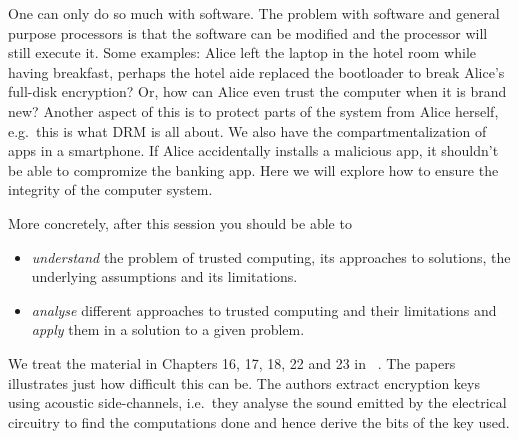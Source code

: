 One can only do so much with software.
The problem with software and general purpose processors is that the software 
can be modified and the processor will still execute it.
Some examples: Alice left the laptop in the hotel room while having breakfast, 
perhaps the hotel aide replaced the bootloader to break Alice's full-disk 
encryption?
Or, how can Alice even trust the computer when it is brand new?
Another aspect of this is to protect parts of the system from Alice herself, 
e.g.\ this is what \ac{DRM} is all about.
We also have the compartmentalization of apps in a smartphone.
If Alice accidentally installs a malicious app, it shouldn't be able to 
compromize the banking app.
Here we will explore how to ensure the integrity of the computer system.

More concretely, after this session you should be able to
\begin{itemize}
  \item \emph{understand} the problem of trusted computing, its approaches to 
    solutions, the underlying assumptions and its limitations.
  \item \emph{analyse} different approaches to trusted computing and their 
    limitations and \emph{apply} them in a solution to a given problem.
\end{itemize}

We treat the material in Chapters 16, 17, 18, 22 and 23 in 
~\cite{Anderson2008sea}.
The papers~\cite{%
  VoltageKeyExtraction,AcousticKeyExtraction,ElectromagneticKeyExtraction%
} illustrates just how difficult this can be.
The authors extract encryption keys using acoustic side-channels, i.e.\ they 
analyse the sound emitted by the electrical circuitry to find the computations 
done and hence derive the bits of the key used.
